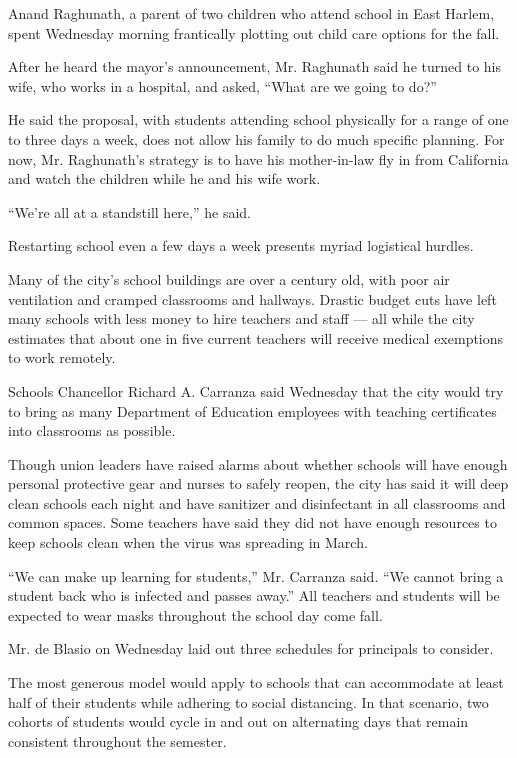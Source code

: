 Anand Raghunath, a parent of two children who attend school in East
Harlem, spent Wednesday morning frantically plotting out child care
options for the fall.

After he heard the mayor's announcement, Mr. Raghunath said he turned to
his wife, who works in a hospital, and asked, ``What are we going to
do?''

He said the proposal, with students attending school physically for a
range of one to three days a week, does not allow his family to do much
specific planning. For now, Mr. Raghunath's strategy is to have his
mother-in-law fly in from California and watch the children while he and
his wife work.

``We're all at a standstill here,'' he said.

Restarting school even a few days a week presents myriad logistical
hurdles.

Many of the city's school buildings are over a century old, with poor
air ventilation and cramped classrooms and hallways. Drastic budget cuts
have left many schools with less money to hire teachers and staff ---
all while the city estimates that about one in five current teachers
will receive medical exemptions to work remotely.

Schools Chancellor Richard A. Carranza said Wednesday that the city
would try to bring as many Department of Education employees with
teaching certificates into classrooms as possible.

Though union leaders have raised alarms about whether schools will have
enough personal protective gear and nurses to safely reopen, the city
has said it will deep clean schools each night and have sanitizer and
disinfectant in all classrooms and common spaces. Some teachers have
said they did not have enough resources to keep schools clean when the
virus was spreading in March.

``We can make up learning for students,'' Mr. Carranza said. ``We cannot
bring a student back who is infected and passes away.'' All teachers and
students will be expected to wear masks throughout the school day come
fall.

Mr. de Blasio on Wednesday laid out three schedules for principals to
consider.

The most generous model would apply to schools that can accommodate at
least half of their students while adhering to social distancing. In
that scenario, two cohorts of students would cycle in and out on
alternating days that remain consistent throughout the semester.

